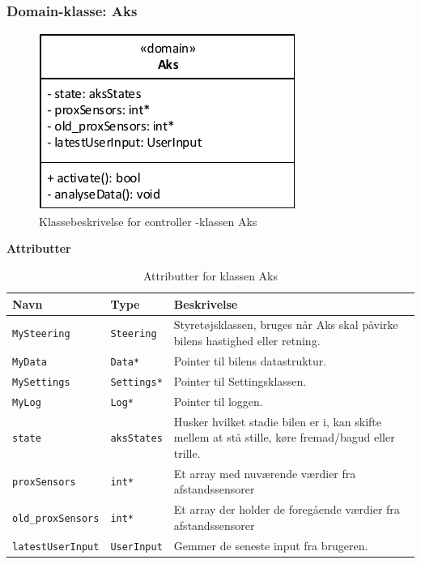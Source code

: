 \subsubsection{Domain-klasse: Aks}

\begin{figure}[h]
\centering
\includegraphics[scale=1]{../fig/diagrammer/bil/cd_aks.pdf}
\caption{Klassebeskrivelse for controller -klassen Aks}
\label{fig:cd_aks}
\end{figure}

\textbf{Attributter}

\begin{table}[h]
\begin{tabularx}{\textwidth}{| Z | Z | L{9cm} |} \hline
Navn & Type & Beskrivelse \\\hline
\texttt{MySteering} & \texttt{Steering} & Styretøjsklassen, bruges når Aks skal påvirke bilens hastighed eller retning.\\\hline
\texttt{MyData} & \texttt{Data*} & Pointer til bilens datastruktur.\\\hline
\texttt{MySettings} & \texttt{Settings*} & Pointer til Settingsklassen. \\\hline
\texttt{MyLog} & \texttt{Log*} & Pointer til loggen. \\\hline
\texttt{state} & \texttt{aksStates} & Husker hvilket stadie bilen er i, kan skifte mellem at stå stille, køre fremad/bagud eller trille. \\\hline
\texttt{proxSensors} & \texttt{int*} & Et array med nuværende værdier fra afstandssensorer \\\hline
\texttt{old\_proxSensors} & \texttt{int*} & Et array der holder de foregående værdier fra afstandssensorer \\\hline
\texttt{latestUserInput} & \texttt{UserInput} & Gemmer de seneste input fra brugeren. \\ \hline
\end{tabularx}
\caption{Attributter for klassen Aks}
\label{table:attr_aks}
\end{table}

